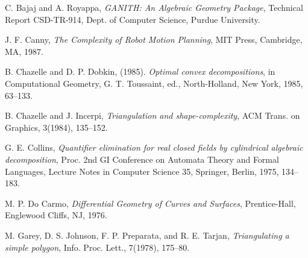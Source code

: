 \begin{thebibliography}{Abhyankar 87b}


C. Bajaj and A. Royappa,
{\em GANITH: An Algebraic Geometry Package},
Technical Report CSD-TR-914, Dept. of Computer Science, Purdue University.

J. F. Canny, 
{\em The Complexity of Robot Motion Planning},
MIT Press, Cambridge, MA, 1987.

B. Chazelle and D. P. Dobkin, (1985).
{\em Optimal convex decompositions},
in Computational Geometry, G. T. Toussaint, ed., North-Holland, New York, 1985, 
63--133.

 B. Chazelle and J. Incerpi, 
{\em Triangulation and shape-complexity},
ACM Trans. on Graphics, 3(1984), 135--152.

G. E. Collins, 
{\em Quantifier elimination for real closed fields by cylindrical 
algebraic decomposition}, 
Proc. 2nd GI Conference on Automata Theory and Formal Languages, 
Lecture Notes in Computer Science 35, Springer, Berlin, 1975, 134--183.


M. P. Do Carmo, 
{\em Differential Geometry of Curves and Surfaces},
Prentice-Hall, Englewood Cliffs, NJ, 1976.


M. Garey, D. S. Johnson, F. P. Preparata, and R. E. Tarjan,
{\em Triangulating a simple polygon},
Info. Proc. Lett., 7(1978), 175--80.



\end{thebibliography}
